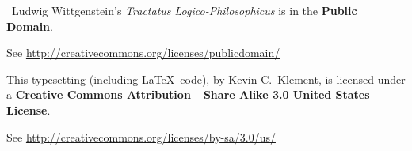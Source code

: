 \documentclass[oneside,openany,12pt]{book}
\begin{document}
\bigskip

\noindent\hrulefill

\phantom{xx}

\noindent{\Huge \copyright}\ Ludwig Wittgenstein's \textit{Tractatus Logico-Philosophicus} is in the \textbf{Public Domain}.

\noindent See \url{http://creativecommons.org/licenses/publicdomain/}


\bigskip

\noindent This typesetting (including \LaTeX\ code), by Kevin C.\ Klement, is licensed under a \textbf{Creative Commons Attribution---Share Alike 3.0 United States License}.

\noindent See \url{http://creativecommons.org/licenses/by-sa/3.0/us/}
\end{document}
